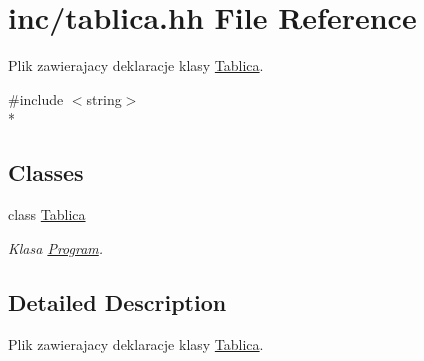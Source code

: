 \hypertarget{tablica_8hh}{\section{inc/tablica.hh File Reference}
\label{tablica_8hh}
}


Plik zawierajacy deklaracje klasy \hyperlink{class_tablica}{Tablica}.  


{\ttfamily \#include $<$string$>$}\\*
\subsection*{Classes}
\begin{DoxyCompactItemize}
\item 
class \hyperlink{class_tablica}{Tablica}
\begin{DoxyCompactList}\small\item\em Klasa \hyperlink{class_program}{Program}. \end{DoxyCompactList}\end{DoxyCompactItemize}


\subsection{Detailed Description}
Plik zawierajacy deklaracje klasy \hyperlink{class_tablica}{Tablica}. 